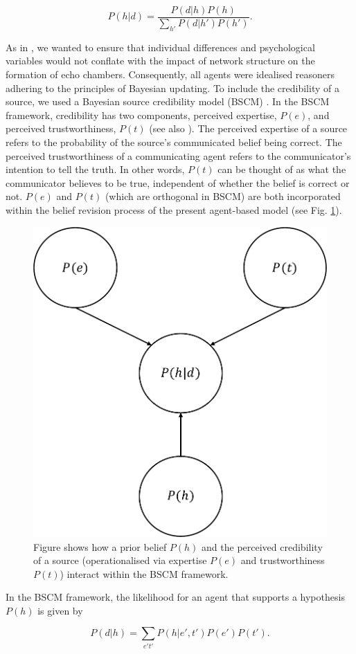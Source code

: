 \documentclass[fleqn,10pt]{wlscirep}
\begin{document}
\begin{equation}
    P(h|d) = \frac{P(d|h)P(h)}{\sum_{h'}P(d|h')P(h')}.              
\end{equation}

As in \cite{madsen2017growing, madsen2018large}, we wanted to ensure that individual differences and psychological variables would not conflate with the impact of network structure on the formation of echo chambers. Consequently, all agents were idealised reasoners adhering to the principles of Bayesian updating. To include the credibility of a source, we used a Bayesian source credibility model (BSCM) \cite{bovens2003bayesian, hahn2009argument, harris2009bayesian}. In the BSCM framework, credibility has two components, perceived expertise, \(P(e)\), and perceived trustworthiness, \(P(t)\) (see also \cite{harris2016appeal}). The perceived expertise of a source refers to the probability of the source's communicated belief being correct. The perceived trustworthiness of a communicating agent refers to the communicator's intention to tell the truth. In other words, \(P(t)\) can be thought of as what the communicator believes to be true, independent of whether the belief is correct or not. \(P(e)\) and \(P(t)\) (which are orthogonal in BSCM) are both incorporated within the belief revision process of the present agent-based model (see Fig. \ref{fig:bscm}).

\begin{figure}[ht]
\centering
\includegraphics[width=0.4\columnwidth]{img/bscm_pdf.pdf}
\caption{Figure shows how a prior belief \(P(h)\) and the perceived credibility of a source (operationalised via expertise \(P(e)\) and trustworthiness \(P(t)\)) interact within the BSCM framework.}
\label{fig:bscm}
\label{fig:bscm}
\end{figure}

In the BSCM framework, the likelihood for an agent that supports a hypothesis  \(P(h)\) is given by

\begin{equation}
    P(d|h) = \sum_{e't'}P(h|e',t')P(e')P(t'). 
\end{equation}
\end{document}
